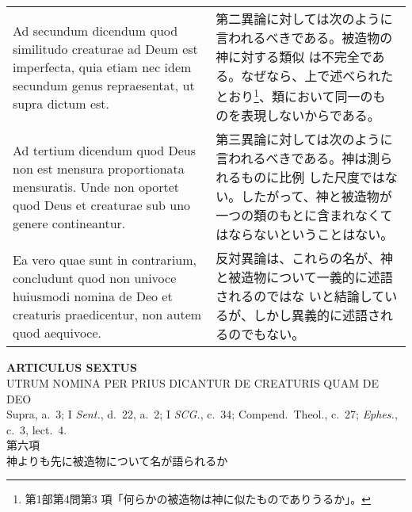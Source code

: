 \documentclass[10pt]{jsarticle} %
\begin{document}
\begin{longtable}{p{21em}p{21em}}
\\

{\sc Ad secundum dicendum} quod similitudo creaturae ad Deum est
imperfecta, quia etiam nec idem secundum genus repraesentat, ut supra
dictum est.

&

第二異論に対しては次のように言われるべきである。被造物の神に対する類似
は不完全である。なぜなら、上で述べられたとおり\footnote{第1部第4問第3
項「何らかの被造物は神に似たものでありうるか」。}、類において同一のも
のを表現しないからである。


\\


{\sc Ad tertium dicendum} quod Deus non est mensura proportionata
mensuratis. Unde non oportet quod Deus et creaturae sub uno genere
contineantur.

&

第三異論に対しては次のように言われるべきである。神は測られるものに比例
した尺度ではない。したがって、神と被造物が一つの類のもとに含まれなくて
はならないということはない。


\\


Ea vero quae sunt in contrarium, concludunt quod non univoce huiusmodi
nomina de Deo et creaturis praedicentur, non autem quod aequivoce.


&

反対異論は、これらの名が、神と被造物について一義的に述語されるのではな
いと結論しているが、しかし異義的に述語されるのでもない。


\end{longtable}

\newpage
{}

\begin{center}
 {\Large {\bf ARTICULUS SEXTUS}}\\
 {\large UTRUM NOMINA PER PRIUS DICANTUR DE CREATURIS QUAM DE DEO}\\
 {\footnotesize Supra, a.~3; I {\itshape Sent.}, d.~22, a.~2; I
 {\itshape SCG.}, c.~34; Compend.~Theol.}, c.~27; {\itshape Ephes.},
 c.~3, lect.~4.\\
 {\Large 第六項\\神よりも先に被造物について名が語られるか}
\end{center}
\end{document}
